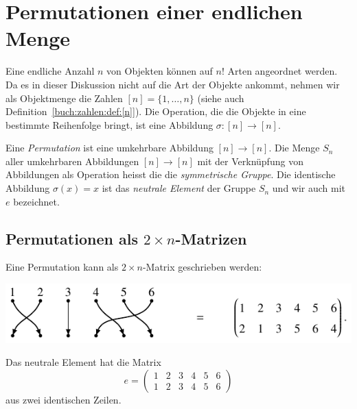 %
%
%
\section{Permutationen einer endlichen Menge
\label{buch:section:permutationen-einer-endlichen-menge}}
Eine endliche Anzahl $n$ von Objekten können auf $n!$ Arten angeordnet
werden.
Da es in dieser Diskussion nicht auf die Art der Objekte ankommt,
nehmen wir als Objektmenge die Zahlen $[n] = \{ 1,\dots,n\}$
(siehe auch Definition~\ref{buch:zahlen:def:[n]}).
Die Operation, die die Objekte in eine bestimmte Reihenfolge bringt,
ist eine Abbildung $\sigma\colon[n]\to[n]$.

\begin{definition}
\label{buch:permutationen:def:permutation}
Eine {\em Permutation} ist eine umkehrbare Abbildung $[n]\to[n]$.
Die Menge $S_n$ aller umkehrbaren Abbildungen $[n]\to[n]$
mit der Verknüpfung von Abbildungen als Operation heisst die
die {\em symmetrische Gruppe}.
%
Die identische Abbildung $\sigma(x)=x$ ist das {\em neutrale
Element} der Gruppe $S_n$ und wir auch mit $e$ bezeichnet.
%
\end{definition}

\subsection{Permutationen als $2\times n$-Matrizen}
Eine Permutation kann als $2\times n$-Matrix geschrieben werden:
\begin{center}
\includegraphics{chapters/50-permutationen/images/permutation.pdf}
\end{center}
Das neutrale Element hat die Matrix
\[
e = \begin{pmatrix}
1&2&3&4&5&6\\
1&2&3&4&5&6
\end{pmatrix}
\]
aus zwei identischen Zeilen.

